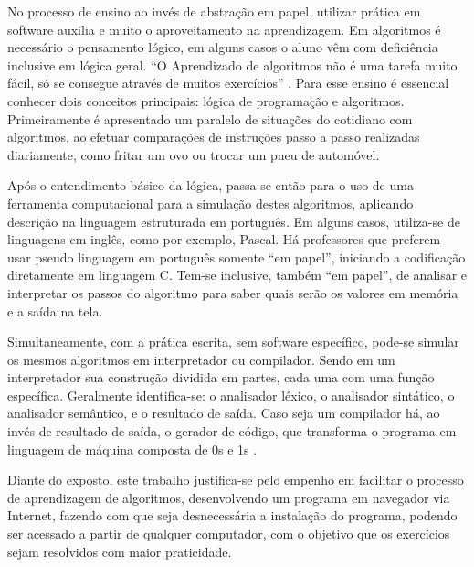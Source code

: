 No processo de ensino ao invés de abstração em papel, utilizar prática em software auxilia e muito o aproveitamento na aprendizagem. Em algoritmos é necessário o pensamento lógico, em alguns casos o aluno vêm com deficiência inclusive em lógica geral. ``O Aprendizado de algoritmos não é uma tarefa muito fácil, só se consegue através de muitos exercícios'' \cite[p.~1]{lopes2002etal}. Para esse ensino é essencial conhecer dois conceitos principais: lógica de programação e algoritmos. Primeiramente é apresentado um paralelo de situações do cotidiano com algoritmos, ao efetuar comparações de instruções passo a passo realizadas diariamente, como fritar um ovo ou trocar um pneu de automóvel.

Após o entendimento básico da lógica, passa-se então para o uso de uma ferramenta computacional para a simulação destes algoritmos, aplicando descrição na linguagem estruturada em português. Em alguns casos, utiliza-se de linguagens em inglês, como por exemplo, Pascal. Há professores que preferem usar pseudo linguagem em português somente ``em papel'', iniciando a codificação diretamente em linguagem C. Tem-se inclusive, também ``em papel'', de analisar e interpretar os passos do algoritmo para saber quais serão os valores em memória e a saída na tela.

Simultaneamente, com a prática escrita, sem software específico, pode-se simular os mesmos algoritmos em interpretador ou compilador. Sendo em um interpretador sua construção dividida em partes, cada uma com uma função específica. Geralmente identifica-se: o analisador léxico, o analisador sintático, o analisador semântico, e o resultado de saída. Caso seja um compilador há, ao invés de resultado de saída, o gerador de código, que transforma o programa em linguagem de máquina composta de 0s e 1s \cite{delamaro2004}.

Diante do exposto, este trabalho justifica-se pelo empenho em facilitar o processo de aprendizagem de algoritmos, desenvolvendo um programa em navegador via Internet, fazendo com que seja desnecessária a instalação do programa,  podendo ser acessado a partir de qualquer computador, com o objetivo que os exercícios sejam resolvidos com maior praticidade.\color{black}
